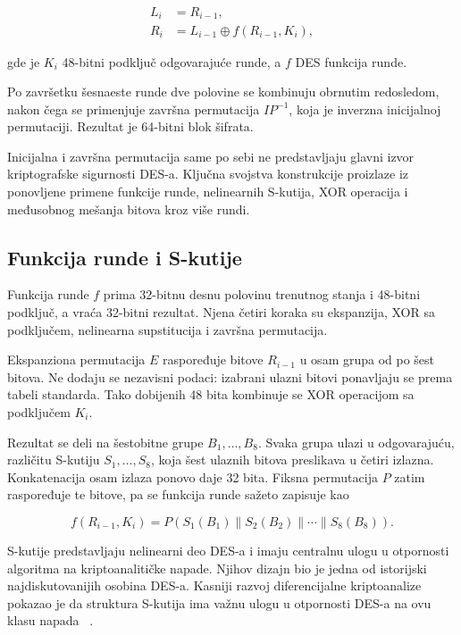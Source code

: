 \begin{align}
    L_i &= R_{i-1}, \\
    R_i &= L_{i-1} \oplus f(R_{i-1},K_i),
    \label{eq:des-feistel}
\end{align}

gde je $K_i$ 48-bitni podključ odgovarajuće runde, a $f$ DES funkcija
runde.

Po završetku šesnaeste runde dve polovine se kombinuju obrnutim
redosledom, nakon čega se primenjuje završna permutacija
$IP^{-1}$, koja je inverzna inicijalnoj permutaciji. Rezultat je
64-bitni blok šifrata.

Inicijalna i završna permutacija same po sebi ne predstavljaju glavni
izvor kriptografske sigurnosti DES-a. Ključna svojstva konstrukcije
proizlaze iz ponovljene primene funkcije runde, nelinearnih S-kutija,
XOR operacija i međusobnog mešanja bitova kroz više rundi.


\subsection{Funkcija runde i S-kutije}
\label{subsec:des_round_function}

Funkcija runde $f$ prima 32-bitnu desnu polovinu trenutnog stanja i
48-bitni podključ, a vraća 32-bitni rezultat. Njena četiri koraka su
ekspanzija, XOR sa podključem, nelinearna supstitucija i završna permutacija.

Ekspanziona permutacija $E$ raspoređuje bitove $R_{i-1}$ u osam grupa
od po šest bitova. Ne dodaju se nezavisni podaci: izabrani ulazni bitovi
ponavljaju se prema tabeli standarda. Tako dobijenih 48 bita kombinuje
se XOR operacijom sa podključem $K_i$.

Rezultat se deli na šestobitne grupe $B_1,\ldots,B_8$. Svaka grupa
ulazi u odgovarajuću, različitu S-kutiju $S_1,\ldots,S_8$, koja šest
ulaznih bitova preslikava u četiri izlazna. Konkatenacija osam izlaza
ponovo daje 32 bita. Fiksna permutacija $P$ zatim raspoređuje te bitove,
pa se funkcija runde sažeto zapisuje kao

\begin{equation}
 f(R_{i-1},K_i)=P\left(S_1(B_1)\parallel S_2(B_2)\parallel\cdots\parallel S_8(B_8)\right).
 \label{eq:des-f}
\end{equation}

S-kutije predstavljaju nelinearni deo DES-a i imaju centralnu ulogu u
otpornosti algoritma na kriptoanalitičke napade. Njihov dizajn bio je
jedna od istorijski najdiskutovanijih osobina DES-a. Kasniji razvoj
diferencijalne kriptoanalize pokazao je da struktura S-kutija ima
važnu ulogu u otpornosti DES-a na ovu klasu napada
~\cite{biham-shamir-1991,biham-shamir-full-des-1993}.

